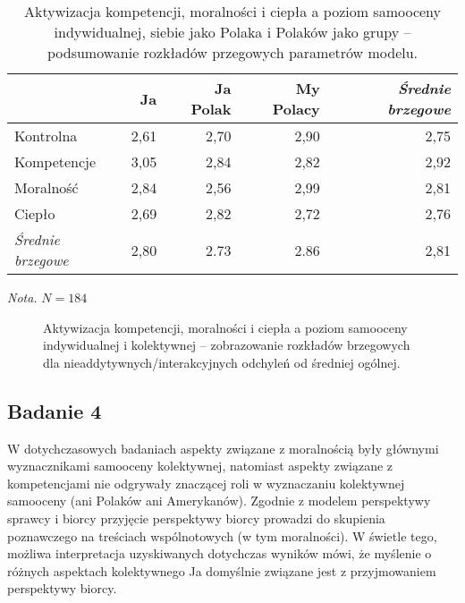 \documentclass[man]{apa6}
\begin{document}
\begin{table*}[htbp]
\vspace*{2em}
\centering
\begin{threeparttable}
\caption{Aktywizacja kompetencji, moralności i ciepła a poziom samooceny indywidualnej, siebie jako Polaka i Polaków jako grupy -- podsumowanie rozkładów przegowych parametrów modelu.}
\label{tab:3}
\bgroup
\def\arraystretch{0.85}
\begin{tabular}{lrrrr}
\midrule
                        & Ja        & Ja Polak  & My Polacy & \emph{Średnie brzegowe}\\
\midrule
Kontrolna               & 2,61      & 2,70      & 2,90      & 2,75 \\
Kompetencje             & 3,05      & 2,84      & 2,82      & 2,92 \\
Moralność               & 2,84      & 2,56      & 2,99      & 2,81 \\
Ciepło                  & 2,69      & 2,82      & 2,72      & 2,76 \\

\emph{Średnie brzegowe} & 2,80      & 2.73      & 2.86      & 2,81 \\

\bottomrule
\end{tabular}
\egroup
\begin{tablenotes}
{\small
\textit{Nota.} $N = 184$
}
\end{tablenotes}
\end{threeparttable}
\end{table*}

\begin{figure*}[htbp]
   \centering
   \caption{Aktywizacja kompetencji, moralności i ciepła a poziom samooceny indywidualnej i kolektywnej -- zobrazowanie rozkładów brzegowych dla nieaddytywnych/interakcyjnych odchyleń od średniej ogólnej.}
   \label{fig:study3}
\end{figure*}



\newpage
\subsection{Badanie 4}

W dotychczasowych badaniach aspekty związane z moralnością były głównymi wyznacznikami samooceny kolektywnej, natomiast aspekty związane z kompetencjami nie odgrywały znaczącej roli w wyznaczaniu kolektywnej samooceny (ani Polaków ani Amerykanów). Zgodnie z modelem perspektywy sprawcy i biorcy \parencite{abele2014communal} przyjęcie perspektywy biorcy prowadzi do skupienia poznawczego na treściach wspólnotowych (w tym moralności). W świetle tego, możliwa interpretacja uzyskiwanych dotychczas wyników mówi, że myślenie o różnych aspektach kolektywnego Ja domyślnie związane jest z przyjmowaniem perspektywy biorcy.\\
\end{document}
